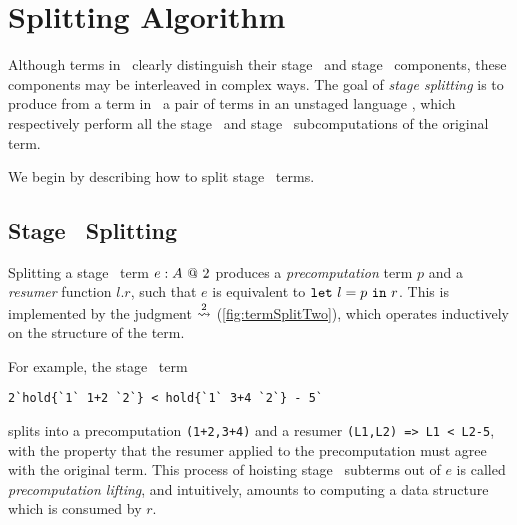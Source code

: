 
\section{Splitting Algorithm}
\label{sec:splitting}


Although terms in \lang\ clearly distinguish their stage \bbone\ and stage
\bbtwo\ components, these components may be interleaved in complex ways. The
goal of \emph{stage splitting} is to produce from a term in \lang\ a pair of
terms in an unstaged language \langmono, which respectively perform all the
stage \bbone\ and stage \bbtwo\ subcomputations of the original term.

We begin by describing how to split stage \bbtwo\ terms.



\subsection {Stage \bbtwo\ Splitting}

Splitting a stage \bbtwo\ term ${e}:{A}~@~ 2$ produces a \emph{precomputation}
term $p$ and a \emph{resumer} function $l.r$, such that $e$ is equivalent to
${\tt let}~{l} = {p}~{\tt in}~{r}$. This is implemented by the judgment $\overset{ 2}\rightsquigarrow$ 
(\cref{fig:termSplitTwo}), which operates inductively on the structure of the
term.

For example, the stage \bbtwo\ term
\begin{lstlisting}
2`hold{`1` 1+2 `2`} < hold{`1` 3+4 `2`} - 5`
\end{lstlisting}
splits into a precomputation \verb|(1+2,3+4)| and a resumer
\verb|(L1,L2) => L1 < L2-5|, with the property that the resumer applied to the
precomputation must agree with the original term. This process of hoisting stage
\bbone\ subterms out of $e$ is called \emph{precomputation lifting}, and
intuitively, amounts to computing a data structure which is consumed by $r$.

